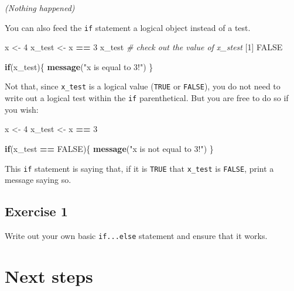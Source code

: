 \documentclass[
]{book}
\newenvironment{Shaded}{\begin{snugshade}}{\end{snugshade}}
\newcommand{\CommentTok}[1]{\textcolor[rgb]{0.56,0.35,0.01}{\textit{#1}}}
\newcommand{\ControlFlowTok}[1]{\textcolor[rgb]{0.13,0.29,0.53}{\textbf{#1}}}
\newcommand{\DecValTok}[1]{\textcolor[rgb]{0.00,0.00,0.81}{#1}}
\newcommand{\KeywordTok}[1]{\textcolor[rgb]{0.13,0.29,0.53}{\textbf{#1}}}
\newcommand{\NormalTok}[1]{#1}
\newcommand{\OperatorTok}[1]{\textcolor[rgb]{0.81,0.36,0.00}{\textbf{#1}}}
\newcommand{\OtherTok}[1]{\textcolor[rgb]{0.56,0.35,0.01}{#1}}
\newcommand{\StringTok}[1]{\textcolor[rgb]{0.31,0.60,0.02}{#1}}
\begin{document}
\emph{(Nothing happened)}

You can also feed the \texttt{if} statement a logical object instead of a test.

\begin{Shaded}
\begin{Highlighting}[]
\NormalTok{x <-}\StringTok{ }\DecValTok{4}
\NormalTok{x_test <-}\StringTok{ }\NormalTok{x }\OperatorTok{==}\StringTok{ }\DecValTok{3}
\NormalTok{x_test }\CommentTok{# check out the value of x_stest}
\NormalTok{[}\DecValTok{1}\NormalTok{] }\OtherTok{FALSE}

\ControlFlowTok{if}\NormalTok{(x_test)\{}
  \KeywordTok{message}\NormalTok{(}\StringTok{"x is equal to 3!"}\NormalTok{)}
\NormalTok{\}}
\end{Highlighting}
\end{Shaded}

Not that, since \texttt{x\_test} is a logical value (\texttt{TRUE} or \texttt{FALSE}), you do not need to write out a logical test within the \texttt{if} parenthetical. But you are free to do so if you wish:

\begin{Shaded}
\begin{Highlighting}[]
\NormalTok{x <-}\StringTok{ }\DecValTok{4}
\NormalTok{x_test <-}\StringTok{ }\NormalTok{x }\OperatorTok{==}\StringTok{ }\DecValTok{3}

\ControlFlowTok{if}\NormalTok{(x_test }\OperatorTok{==}\StringTok{ }\OtherTok{FALSE}\NormalTok{)\{}
  \KeywordTok{message}\NormalTok{(}\StringTok{"x is not equal to 3!"}\NormalTok{)}
\NormalTok{\}}
\end{Highlighting}
\end{Shaded}

This \texttt{if} statement is saying that, if it is \texttt{TRUE} that \texttt{x\_test} is \texttt{FALSE}, print a message saying so.

\hypertarget{exercise-1-1}{%
\subsection*{Exercise 1}\label{exercise-1-1}}

Write out your own basic \texttt{if...else} statement and ensure that it works.

\hypertarget{next-steps-1}{%
\section*{Next steps}\label{next-steps-1}}
\end{document}
